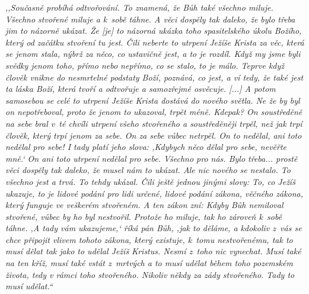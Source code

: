 \textit{%
,,Současně probíhá odtvořování. To znamená, že Bůh také všechno miluje. Všechno
stvořené miluje a k~sobě táhne. A věci dospěly tak daleko, že bylo třeba jim to
názorně ukázat. Že [je] to názorná ukázka toho spasitelského úkolu Božího, který
od začátku stvoření tu jest. Čili neberte to utrpení Ježíše Krista za věc, která
se jenom stala, nýbrž za něco, co ustavičně jest, a to je rozdíl. Když my jsme
byli svědky jenom toho, přímo nebo nepřímo, co se stalo, to je málo. Teprve když
člověk vnikne do nesmrtelné podstaty Boží, poznává, co jest, a ví tedy, že také
jest ta láska Boží, která tvoří a odtvořuje a samozřejmě osvěcuje. [...] A potom
samosebou se celé to utrpení Ježíše Krista dostává do nového světla. Ne že by
byl on nepotřeboval, proto že jenom to ukazoval, trpět méně. Kdepak? On
soustředěně na sebe bral v~té chvíli utrpení všeho stvořeného a soustředěněji
trpěl, než jak trpí člověk, který trpí jenom za sebe. On za sebe vůbec netrpěl.
On to nedělal, ani toto nedělal pro sebe! I tady platí jeho slova: ,Kdybych něco
dělal pro sebe, nevěřte mně.` On ani toto utrpení nedělal pro sebe. Všechno pro
nás. Bylo třeba... prostě věci dospěly tak daleko, že musel nám to ukázat. Ale
nic nového se nestalo. To všechno jest a trvá. To tehdy ukázal. Čili ještě
jednou jinými slovy: To, co Ježíš ukazuje, to je lidové podání pro lidi určené,
lidové podání zákona, věčného zákona, který funguje ve veškerém stvořeném. A ten
zákon zní: Kdyby Bůh nemiloval stvořené, vůbec by ho byl nestvořil. Protože ho
miluje, tak ho zároveň k~sobě táhne.  ,A tady vám ukazujeme,` říká pán Bůh, ,jak
to děláme, a kdokoliv z~vás se chce připojit vlivem tohoto zákona, který
existuje, k~tomu nestvořenému, tak to musí dělat tak jako to udělal Ježíš
Kristus. Nesmí z~toho nic vynechat. Musí také na ten kříž, musí také vstát
z~mrtvých a to musí udělat během toho pozemském života, tedy v rámci toho
stvořeného. Nikoliv někdy za zády stvořeného. Tady to musí udělat.``
}

